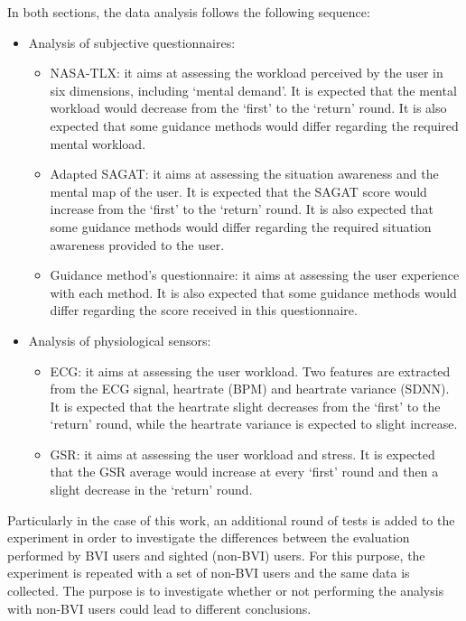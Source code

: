 In both sections, the data analysis follows the following sequence:

\begin{itemize}
    \item Analysis of subjective questionnaires:
    \begin{itemize}
        \item NASA-TLX: it aims at assessing the workload perceived by the user in six dimensions, including ‘mental demand’. It is expected that the mental workload would decrease from the ‘first’ to the ‘return’ round. It is also expected that some guidance methods would differ regarding the required mental workload.
        \item Adapted SAGAT: it aims at assessing the situation awareness and the mental map of the user. It is expected that the SAGAT score would increase from the ‘first’ to the ‘return’ round. It is also expected that some guidance methods would differ regarding the required situation awareness provided to the user.
        \item Guidance method’s questionnaire: it aims at assessing the user experience with each method. It is also expected that some guidance methods would differ regarding the score received in this questionnaire.
    \end{itemize}
    \item Analysis of physiological sensors:
    \begin{itemize}
        \item ECG: it aims at assessing the user workload. Two features are extracted from the ECG signal, heartrate (BPM) and heartrate variance (SDNN). It is expected that the heartrate slight decreases from the ‘first’ to the ‘return’ round, while the heartrate variance is expected to slight increase.
        \item GSR: it aims at assessing the user workload and stress. It is expected that the GSR average would increase at every ‘first’ round and then a slight decrease in the ‘return’ round.
    \end{itemize}
\end{itemize}

Particularly in the case of this work, an additional round of tests is added to the experiment in order to investigate the differences between the evaluation performed by BVI users and sighted (non-BVI) users. For this purpose, the experiment is repeated with a set of non-BVI users and the same data is collected. The purpose is to investigate whether or not performing the analysis with non-BVI users could lead to different conclusions.


